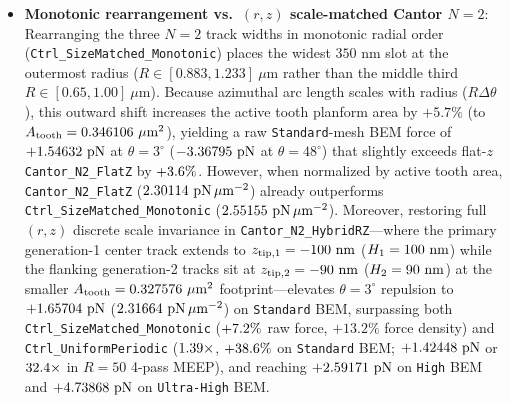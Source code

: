 \documentclass[11pt,letterpaper]{article}
\begin{document}
\begin{itemize}
    \item \textbf{Monotonic rearrangement vs.\ $(r,z)$ scale-matched Cantor $N=2$}: Rearranging the three $N=2$ track widths in monotonic radial order (\texttt{Ctrl\_SizeMatched\_Monotonic}) places the widest $350\text{ nm}$ slot at the outermost radius ($R \in [0.883, 1.233]\ \mu\text{m}$ rather than the middle third $R \in [0.65, 1.00]\ \mu\text{m}$). Because azimuthal arc length scales with radius ($R\Delta\theta$), this outward shift increases the active tooth planform area by $+5.7\%$ (to $A_{\rm tooth} = 0.346106{}\ \mu\text{m}^2$), yielding a raw \texttt{Standard}-mesh BEM force of $+1.54632{}\text{ pN}$ at $\theta=3^\circ$ ($-3.36795{}\text{ pN}$ at $\theta=48^\circ$) that slightly exceeds flat-$z$ \texttt{Cantor\_N2\_FlatZ} by $+3.6{}\%$. However, when normalized by active tooth area, \texttt{Cantor\_N2\_FlatZ} ($2.30114{}\text{ pN}\,\mu\text{m}^{-2}$) already outperforms \texttt{Ctrl\_SizeMatched\_Monotonic} ($2.55155{}\text{ pN}\,\mu\text{m}^{-2}$). Moreover, restoring full $(r,z)$ discrete scale invariance in \texttt{Cantor\_N2\_HybridRZ}---where the primary generation-1 center track extends to $z_{\rm tip,1} = -100{}\text{ nm}$ ($H_1 = 100{}\text{ nm}$) while the flanking generation-2 tracks sit at $z_{\rm tip,2} = -90{}\text{ nm}$ ($H_2 = 90{}\text{ nm}$) at the smaller $A_{\rm tooth} = 0.327576{}\ \mu\text{m}^2$ footprint---elevates $\theta=3^\circ$ repulsion to $+1.65704{}\text{ pN}$ ($2.31664{}\text{ pN}\,\mu\text{m}^{-2}$) on \texttt{Standard} BEM, surpassing both \texttt{Ctrl\_SizeMatched\_Monotonic} ($+7.2{}\%$ raw force, $+13.2\%$ force density) and \texttt{Ctrl\_UniformPeriodic} ($1.39{}\times$, $+38.6{}\%$ on \texttt{Standard} BEM; $+1.42448{}\text{ pN}$ or $32.4{}\times$ in $R=50$ 4-pass MEEP), and reaching $+2.59171{}\text{ pN}$ on \texttt{High} BEM and $+4.73868{}\text{ pN}$ on \texttt{Ultra-High} BEM.

\end{itemize}
\end{document}
